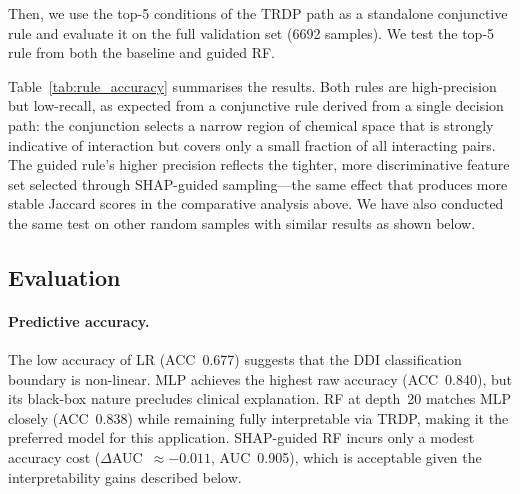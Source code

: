 \documentclass[letterpaper]{article} %
\begin{document}
Then, we use the top-5 conditions of the TRDP path as a standalone conjunctive rule and evaluate it on the full validation set (6692 samples). We test the top-5 rule from both the baseline and guided RF.

Table~\ref{tab:rule_accuracy} summarises the results. Both rules are high-precision but low-recall, as expected from a conjunctive rule derived from a single decision path: the conjunction selects a narrow region of chemical space that is strongly indicative of interaction but covers only a small fraction of all interacting pairs. The guided rule's higher precision reflects the tighter, more discriminative feature set selected through SHAP-guided sampling---the same effect that produces more stable Jaccard scores in the comparative analysis above. We have also conducted the same test on other random samples with similar results as shown below.

\begin{table}[h]
\centering
\caption{Top-5-condition TRDP rule applied to the full validation set (6{,}692 samples).}%
\label{tab:rule_accuracy}
\end{table}



\subsection{Evaluation}

\paragraph{Predictive accuracy.}
The low accuracy of LR (ACC~0.677) suggests that the DDI classification boundary is non-linear. MLP achieves the highest raw accuracy (ACC~0.840), but its black-box nature precludes clinical explanation. RF at depth~20 matches MLP closely (ACC~0.838) while remaining fully interpretable via TRDP, making it the preferred model for this application. SHAP-guided RF incurs only a modest accuracy cost ($\Delta$AUC~$\approx -0.011$, AUC~0.905), which is acceptable given the interpretability gains described below.
\end{document}
